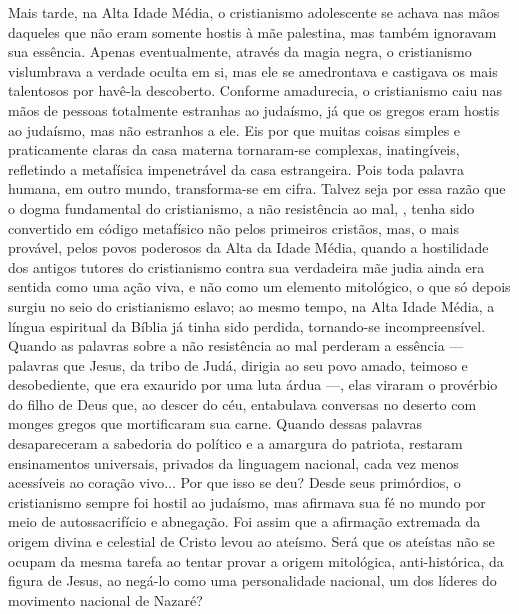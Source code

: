 Mais tarde, na Alta Idade Média, o cristianismo adolescente se achava
nas mãos daqueles que não eram somente hostis à mãe palestina, mas
também ignoravam sua essência. Apenas eventualmente, através da magia
negra, o cristianismo vislumbrava a verdade oculta em si, mas ele se
amedrontava e castigava os mais talentosos por havê-la descoberto.
Conforme amadurecia, o cristianismo caiu nas mãos de pessoas totalmente
estranhas ao judaísmo, já que os gregos eram hostis ao judaísmo, mas não
estranhos a ele. Eis por que muitas coisas simples e praticamente claras
da casa materna tornaram-se complexas, inatingíveis, refletindo a
metafísica impenetrável da casa estrangeira. Pois toda palavra humana,
em outro mundo, transforma-se em cifra. Talvez seja por essa razão que o
dogma fundamental do cristianismo, a não resistência ao mal, , tenha
sido convertido em código metafísico não pelos primeiros cristãos, mas,
o mais provável, pelos povos poderosos da Alta da Idade Média, quando a
hostilidade dos antigos tutores do cristianismo contra sua verdadeira
mãe judia ainda era sentida como uma ação viva, e não como um elemento
mitológico, o que só depois surgiu no seio do cristianismo eslavo; ao
mesmo tempo, na Alta Idade Média, a língua espiritual da Bíblia já tinha
sido perdida, tornando-se incompreensível. Quando as palavras sobre a
não resistência ao mal perderam a essência --- palavras que Jesus, da
tribo de Judá, dirigia ao seu povo amado, teimoso e desobediente, que
era exaurido por uma luta árdua ---, elas viraram o provérbio do filho
de Deus que, ao descer do céu, entabulava conversas no deserto com
monges gregos que mortificaram sua carne. Quando dessas palavras
desapareceram a sabedoria do político e a amargura do patriota, restaram
ensinamentos universais, privados da linguagem nacional, cada vez menos
acessíveis ao coração vivo... Por que isso se deu? Desde seus
primórdios, o cristianismo sempre foi hostil ao judaísmo, mas afirmava
sua fé no mundo por meio de autossacrifício e abnegação. Foi assim que a
afirmação extremada da origem divina e celestial de Cristo levou ao
ateísmo. Será que os ateístas não se ocupam da mesma tarefa ao tentar
provar a origem mitológica, anti-histórica, da figura de Jesus, ao
negá-lo como uma personalidade nacional, um dos líderes do movimento
nacional de Nazaré?

